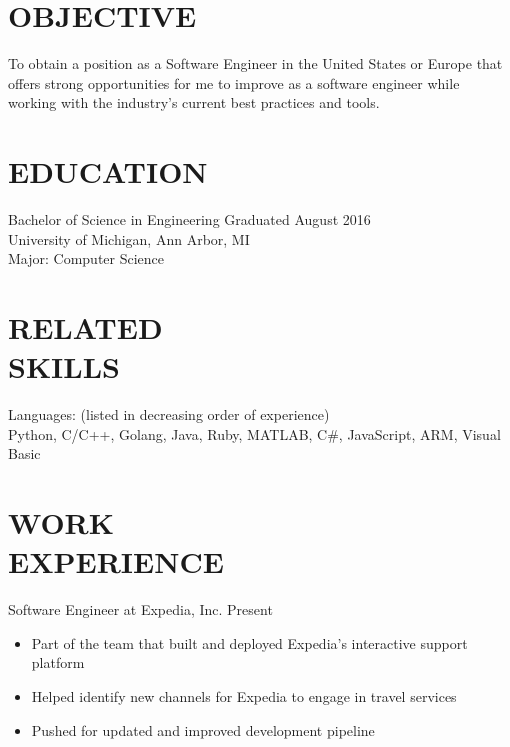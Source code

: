 \documentclass[line,margin]{res}
\begin{document}

\color{HeaderColor}
\address{\hfill riizade@gmail.com -- 248-716-5054}
\address{10555 Main Street, Apt 331, Bellevue, WA, 98004}

 
 \renewcommand{\labelitemi}{$-$}
 
\begin{resume}
\color{black}
\section{\textcolor{HeaderColor}{OBJECTIVE}}
				To obtain a position as a Software Engineer in the United States or Europe that offers strong opportunities for me to improve as a software engineer while working with the industry's current best practices and tools.

\section{\textcolor{HeaderColor}{EDUCATION}} {\sc Bachelor of Science in Engineering} \hfill Graduated August 2016\\
				University of Michigan, Ann Arbor, MI \\
                Major: Computer Science \\
 
\section{\textcolor{HeaderColor}{RELATED \\ SKILLS}} 
				{\sc Languages: (listed in decreasing order of experience)} \\
				Python, C/C++, Golang, Java, Ruby, MATLAB, C\#, JavaScript, ARM, Visual Basic \\
 
\section{\textcolor{HeaderColor}{WORK \\ EXPERIENCE}} 

	      {\sc Software Engineer at Expedia, Inc.} \hfill Present
                 \begin{itemize}  \itemsep -2pt %
                 \item Part of the team that built and deployed Expedia's interactive support platform
	      \item Helped identify new channels for Expedia to engage in travel services
	      \item Pushed for updated and improved development pipeline
                 \end{itemize}


\end{resume}
\end{document}
